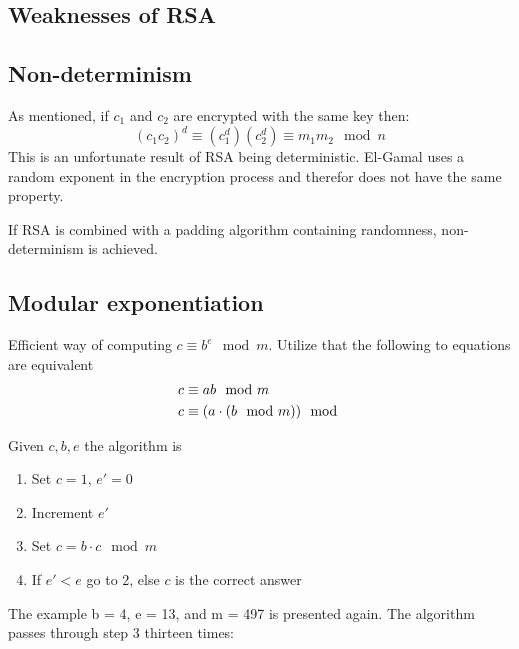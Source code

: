\subsection{Weaknesses of RSA}


\subsection{Non-determinism}
As mentioned, if $c_1$ and $c_2$ are encrypted with the same key then:
\begin{equation}
  (c_1c_2)^d \equiv (c_1^d) (c_2^d) \equiv m_1m_2 \mod n
\end{equation}
This is an unfortunate result of RSA being deterministic. El-Gamal
uses a random exponent in the encryption process and therefor does not
have the same property.

If RSA is combined with a padding algorithm containing randomness,
non-determinism is achieved.

\subsection{Modular exponentiation}

Efficient way of computing $c \equiv b^e \mod m$. Utilize that the following
to equations are equivalent
\begin{align*}
  c &\equiv ab \mod m\\
  c &\equiv (a \cdot (b \mod m)) \mod
\end{align*}

Given $c, b, e$ the algorithm is
\begin{enumerate}
\item Set $c = 1$, $e' = 0$
\item Increment $e'$
\item Set $c = b \cdot c \mod m$
\item If $e' < e$ go to 2, else $c$ is the correct answer
\end{enumerate}

The example b = 4, e = 13, and m = 497 is presented again. The algorithm passes through step 3 thirteen times:

